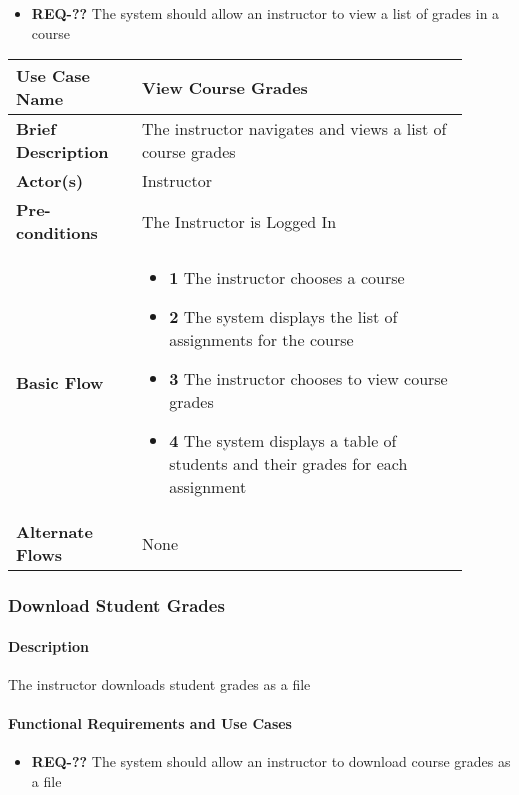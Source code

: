 \documentclass{article}
\begin{document}
\begin{itemize}
  \item\textbf{REQ-??} The system should allow an instructor to view a list of grades in a course
\end{itemize}

\vspace{0.2in}

\begin{tabular}{| p{0.25\linewidth} | p{0.65\linewidth} |}
  \hline
  \textbf{Use Case Name} & View Course Grades \\
  \hline
  \textbf{Brief Description} & The instructor navigates and views a list of course grades \\
  \hline
  \textbf{Actor(s)} & Instructor \\
  \hline
  \textbf{Pre-conditions} & The Instructor is Logged In\\
  \hline
  \textbf{Basic Flow} & \begin{itemize}
    \item[] \textbf{1} The instructor chooses a course
    \item[] \textbf{2} The system displays the list of assignments for the course
    \item[] \textbf{3} The instructor chooses to view course grades
    \item[] \textbf{4} The system displays a table of students and their grades for each assignment
  \end{itemize}\\
  \hline
  \textbf{Alternate Flows} & None\\
  \hline
\end{tabular}

\subsubsection{Download Student Grades}

\paragraph{Description} The instructor downloads student grades as a file

\paragraph{Functional Requirements and Use Cases}

\begin{itemize}
  \item \textbf{REQ-??} The system should allow an instructor to download course grades as a file
\end{itemize}
\end{document}
